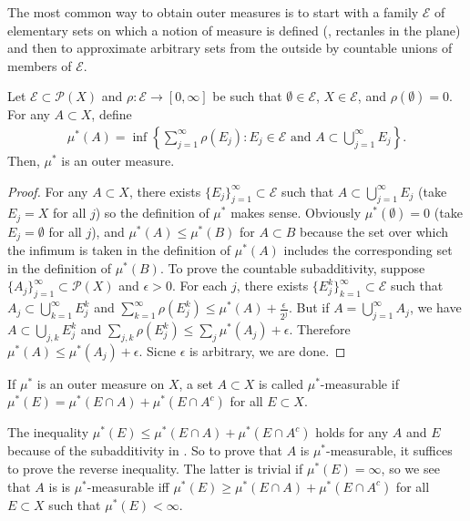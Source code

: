 The most common way to obtain outer measures is to start with a family $\mathcal{E}$ of elementary sets on which a notion of measure is defined (\ie, rectanles in the plane) and then to approximate arbitrary sets from the outside by countable unions of members of $\mathcal{E}$.

\begin{proposition}
    Let $\mathcal{E} \subset \mathcal{P}(X)$ and $\rho : \mathcal{E} \to [0, \infty]$ be such that $\emptyset \in \mathcal{E}$, $X \in \mathcal{E}$, and $\rho(\emptyset) = 0$.
    For any $A \subset X$, define
    \begin{align}
        \mu^*(A) = \inf \left\{ \sum_{j=1}^{\infty} \rho(E_j): E_j \in \mathcal{E} \text{ and } A \subset \bigcup _{j=1}^{\infty} E_j \right\}.
    \end{align}
    Then, $\mu^*$ is an outer measure.
\end{proposition}

\begin{proof}
    For any $A \subset X$, there exists $\{ E_j \}_{j=1}^{\infty} \subset \mathcal{E}$ such that $A \subset \bigcup_{j=1}^{\infty} E_j$ (take $E_j = X$ for all $j$) so the definition of $\mu^*$ makes sense.
    Obviously $\mu^*(\emptyset) = 0$ (take $E_j = \emptyset$ for all $j$), and $\mu^*(A) \le \mu^*(B)$ for $A \subset B$ because the set over which the infimum is taken in the definition of $\mu^*(A)$ includes the corresponding set in the definition of $\mu^*(B)$.
    To prove the countable subadditivity, suppose $\{ A_j \}_{j=1}^{\infty} \subset \mathcal{P}(X)$ and $\epsilon > 0$. For each $j$, there exists $\{ E_{j}^{k} \}_{k=1}^{\infty} \subset \mathcal{E}$ such that $A_j \subset \bigcup_{k=1}^{\infty} E_{j}^{k}$ and $\sum_{k=1}^{\infty} \rho(E_{j}^{k}) \le \mu^*(A) + \frac{\epsilon}{2^j}$. 
    But if $A = \bigcup_{j=1}^{\infty} A_j$, we have $A \subset \bigcup_{j,k} E_{j}^{k}$ and $\sum_{j,k} \rho(E_{j}^{k}) \le \sum_{j} \mu^*(A_j) + \epsilon$.
    Therefore $\mu^*(A) \le \mu^*(A_j) + \epsilon$.
    Sicne $\epsilon$ is arbitrary, we are done.
\end{proof}

\begin{definition}
    If $\mu^*$ is an outer measure on $X$, a set $A \subset X$ is called $\mu^*$-measurable if $\mu^*(E) = \mu^*(E \cap A) + \mu^*(E \cap A^c)$ for all $E \subset X$.
\end{definition}

The inequality $\mu^*(E) \le \mu^*(E \cap A) + \mu^*(E \cap A^c)$ holds for any $A$ and $E$ because of the subadditivity in .
So to prove that $A$ is $\mu^*$-measurable, it suffices to prove the reverse inequality.
The latter is trivial if $\mu^*(E) = \infty$, so we see that $A$ is is $\mu^*$-measurable iff $\mu^*(E) \ge \mu^*(E \cap A) + \mu^*(E \cap A^c)$ for all $E \subset X$ such that $\mu^*(E) < \infty$.

